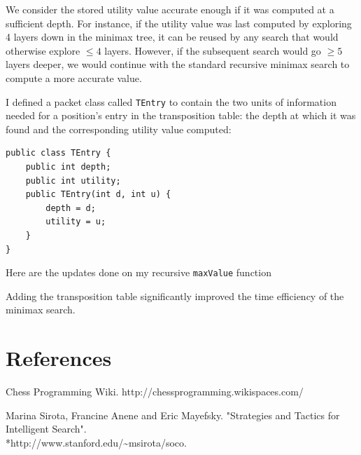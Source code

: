 \documentclass{article}
\begin{document}
We consider the stored utility value accurate enough if it was computed at a sufficient depth. For instance, if the utility value was last computed by exploring 4 layers down in the minimax tree, it can be reused by any search that would otherwise explore $\le 4$ layers. However, if the subsequent search would go $\ge 5$ layers deeper, we would continue with the standard recursive minimax search to compute a more accurate value.

I defined a packet class called \verb`TEntry` to contain the two units of information needed for a position's entry in the transposition table: the depth at which it was found and the corresponding utility value computed:

\begin{lstlisting}
public class TEntry {
	public int depth;
	public int utility;
	public TEntry(int d, int u) {
		depth = d;
		utility = u;
	}
}
\end{lstlisting}

Here are the updates done on my recursive \verb`maxValue` function 

Adding the transposition table significantly improved the time efficiency of the minimax search.

\section{References}

Chess Programming Wiki. http://chessprogramming.wikispaces.com/

Marina Sirota, Francine Anene and Eric Mayefsky. "Strategies and Tactics for Intelligent Search". \\*http://www.stanford.edu/\textasciitilde msirota/soco.
\end{document}
